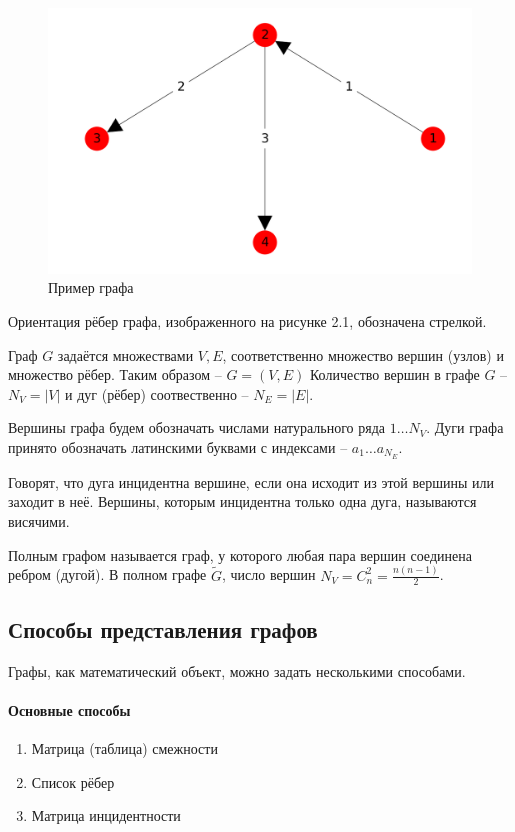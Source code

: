 \begin{figure}[h!]
  \includegraphics[width=\linewidth]{picts/1.png}
  \caption{Пример графа}
  \label{fig:simple_graphs}
\end{figure}

Ориентация рёбер графа, изображенного на рисунке 2.1, обозначена стрелкой.

Граф $ G $ задаётся множествами $V, E$, соответственно множество вершин (узлов) и множество рёбер.
Таким образом -- $G = (V, E)$
Количество вершин в графе $ G $ -- $ N_V = | V | $ и дуг (рёбер) соотвественно -- $ N_E = | E |.$  

Вершины графа будем обозначать числами натурального ряда $ 1\dots N_V $. Дуги графа принято обозначать латинскими буквами с индексами -- $ a_1 \dots a_{N_E} $.

Говорят, что дуга инцидентна вершине, если она исходит из этой вершины или заходит в неё. Вершины, которым инцидентна только одна дуга, называются висячими.

Полным графом называется граф, у которого любая пара вершин соединена ребром (дугой). В полном графе $ \widetilde G $, число вершин $ N_V = C_{n}^2 = \frac{n (n - 1)}{2} $.

\subsection{Способы представления графов}
Графы, как математический объект, можно задать несколькими способами.
\paragraph{Основные способы}
\begin{enumerate}
\item Матрица (таблица) смежности
\item Список рёбер
\item Матрица инцидентности
\end {enumerate}

